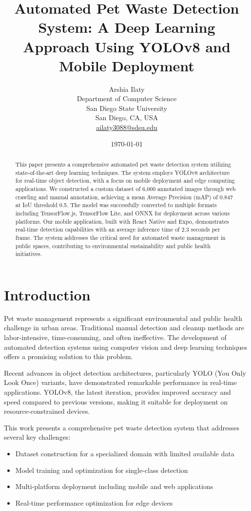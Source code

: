 \documentclass[12pt,a4paper]{article}
\title{Automated Pet Waste Detection System: A Deep Learning Approach Using YOLOv8 and Mobile Deployment}
\author{Arshia Ilaty\\
Department of Computer Science\\
San Diego State University\\
San Diego, CA, USA\\
\url{ailaty3088@sdsu.edu}}
\date{\today}
\begin{document}
\maketitle

\begin{abstract}
This paper presents a comprehensive automated pet waste detection system utilizing state-of-the-art deep learning techniques. The system employs YOLOv8 architecture for real-time object detection, with a focus on mobile deployment and edge computing applications. We constructed a custom dataset of 6,000 annotated images through web crawling and manual annotation, achieving a mean Average Precision (mAP) of 0.847 at IoU threshold 0.5. The model was successfully converted to multiple formats including TensorFlow.js, TensorFlow Lite, and ONNX for deployment across various platforms. Our mobile application, built with React Native and Expo, demonstrates real-time detection capabilities with an average inference time of 2.3 seconds per frame. The system addresses the critical need for automated waste management in public spaces, contributing to environmental sustainability and public health initiatives.
\end{abstract}

\section{Introduction}

Pet waste management represents a significant environmental and public health challenge in urban areas. Traditional manual detection and cleanup methods are labor-intensive, time-consuming, and often ineffective. The development of automated detection systems using computer vision and deep learning techniques offers a promising solution to this problem.

Recent advances in object detection architectures, particularly YOLO (You Only Look Once) variants, have demonstrated remarkable performance in real-time applications. YOLOv8, the latest iteration, provides improved accuracy and speed compared to previous versions, making it suitable for deployment on resource-constrained devices.

This work presents a comprehensive pet waste detection system that addresses several key challenges:
\begin{itemize}
    \item Dataset construction for a specialized domain with limited available data
    \item Model training and optimization for single-class detection
    \item Multi-platform deployment including mobile and web applications
    \item Real-time performance optimization for edge devices
\end{itemize}
\end{document}
